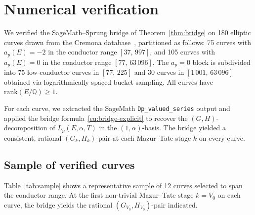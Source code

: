 \documentclass[11pt,a4paper]{amsart}
\theoremstyle{definition}
\newcommand{\Q}{\mathbb{Q}}
\begin{document}
\section{Numerical verification}\label{sec:numerical}

We verified the SageMath--Sprung bridge of Theorem~\ref{thm:bridge} on 180 elliptic curves drawn from the Cremona database~\cite{Cremona}, partitioned as follows: 75 curves with $a_p(E) = -2$ in the conductor range $[37,\,997]$, and 105 curves with $a_p(E) = 0$ in the conductor range $[77,\,63\,096]$. The $a_p = 0$ block is subdivided into 75 low-conductor curves in $[77,\,225]$ and 30 curves in $[1\,001,\,63\,096]$ obtained via logarithmically-spaced bucket sampling. All curves have $\mathrm{rank}(E/\Q) \geq 1$.

For each curve, we extracted the SageMath \texttt{Dp\_valued\_series} output and applied the bridge formula~\eqref{eq:bridge-explicit} to recover the $(G, H)$-decomposition of $L_p(E, \alpha, T)$ in the $(1, \alpha)$-basis. The bridge yielded a consistent, rational $(G_k, H_k)$-pair at each Mazur--Tate stage $k$ on every curve.

\subsection{Sample of verified curves}

Table~\ref{tab:sample} shows a representative sample of 12 curves selected to span the conductor range. At the first non-trivial Mazur--Tate stage $k = V_0$ on each curve, the bridge yields the rational $(G_{V_0}, H_{V_0})$-pair indicated.
\end{document}
